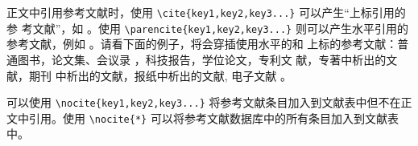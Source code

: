 正文中引用参考文献时，使用 \verb|\cite{key1,key2,key3...}| 可以产生“上标引用的参
考文献”，如 \cite{Yu2001,Cheng1999,LSC1957}。使用
\verb|\parencite{key1,key2,key3...}| 则可以产生水平引用的参考文献，例如
\parencite{Li1999,Jiang1989,Hopkinson1999}。请看下面的例子，将会穿插使用水平的和
上标的参考文献：普通图书\parencite{Yu2001,Jiang1998}，论文集、会议录
\cite{CSTAM1990}，科技报告\parencite{WHO1970}，学位论文\cite{Zhang1998}，专利文
献\parencite{Jiang1989,HBLZ2001}，专著中析出的文献\cite{Cheng1999,GBT2659}，期刊
中析出的文献\parencite{Li1999,Li2000}，报纸中析出的文献\cite{Ding2000}, 电子文献
\parencite{Jiang1999,Christine1998,Xiao2001}。

可以使用 \verb|\nocite{key1,key2,key3...}| 将参考文献条目加入到文献表中但不在正
文中引用。使用 \verb|\nocite{*}| 可以将参考文献数据库中的所有条目加入到文献表
中。
\nocite{Yang1999,Schinstock2000,Wen1990,GBT16159}
